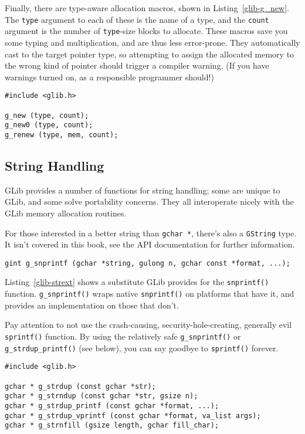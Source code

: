Finally, there are type-aware allocation macros, shown in Listing~\ref{glib-g_new}. The \lstinline{type} argument to each of these is the name of a type, and the \lstinline{count} argument is the number of \lstinline{type}-size blocks to allocate. These macros save you some typing and multiplication, and are thus less error-prone. They automatically cast to the target pointer type, so attempting to assign the allocated memory to the wrong kind of pointer should trigger a compiler warning. (If you have warnings turned on, as a responsible programmer should!)

\begin{lstlisting}[float, caption={Allocation macros}, label=glib-g_new]
#include <glib.h>

g_new (type, count);
g_new0 (type, count);
g_renew (type, mem, count);
\end{lstlisting}


\subsection{String Handling}

GLib provides a number of functions for string handling; some are unique to GLib, and some solve portability concerns. They all interoperate nicely with the GLib memory allocation routines.

For those interested in a better string than \lstinline{gchar *}, there's also a \lstinline{GString} type. It isn't covered in this book, see the API documentation for further information.

\begin{lstlisting}[float, caption={Portability Wrapper}, label=glib-strext]
gint g_snprintf (gchar *string, gulong n, gchar const *format, ...);
\end{lstlisting}

Listing~\ref{glib-strext} shows a substitute GLib provides for the \lstinline{snprintf()} function. \lstinline{g_snprintf()} wraps native \lstinline{snprintf()} on platforms that have it, and provides an implementation on those that don't.

Pay attention to not use the crash-causing, security-hole-creating, generally evil \lstinline{sprintf()} function. By using the relatively safe \lstinline{g_snprintf()} or \lstinline{g_strdup_printf()} (see below), you can say goodbye to \lstinline{sprintf()} forever.

\begin{lstlisting}[float, caption={Allocating Strings}, label=glib-strdup]
#include <glib.h>

gchar * g_strdup (const gchar *str);
gchar * g_strndup (const gchar *str, gsize n);
gchar * g_strdup_printf (const gchar *format, ...);
gchar * g_strdup_vprintf (const gchar *format, va_list args);
gchar * g_strnfill (gsize length, gchar fill_char);
\end{lstlisting}

